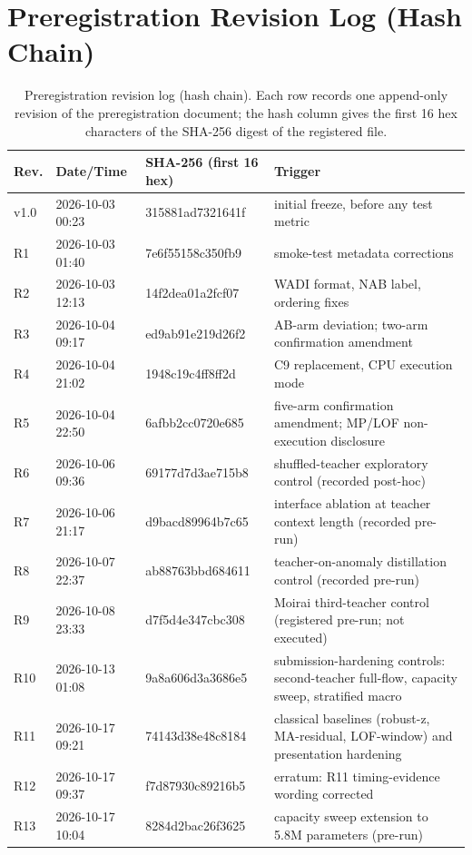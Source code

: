 \documentclass[pdflatex,sn-basic,Numbered]{sn-jnl}
\begin{document}
\appendix
\section{Preregistration Revision Log (Hash Chain)}\label{app:hashchain}
\begin{table}[t]
\centering
\scriptsize
\caption{Preregistration revision log (hash chain). Each row records one
append-only revision of the preregistration document; the hash column gives
the first 16 hex characters of the SHA-256 digest of the registered file.}
\label{tab:hashchain}
\begin{tabular}{lllp{4.2cm}}
\toprule
Rev. & Date/Time & SHA-256 (first 16 hex) & Trigger \\
\midrule
v1.0 & 2026-10-03 00:23 & 315881ad7321641f & initial freeze, before any test metric \\
R1 & 2026-10-03 01:40 & 7e6f55158c350fb9 & smoke-test metadata corrections \\
R2 & 2026-10-03 12:13 & 14f2dea01a2fcf07 & WADI format, NAB label, ordering fixes \\
R3 & 2026-10-04 09:17 & ed9ab91e219d26f2 & AB-arm deviation; two-arm confirmation amendment \\
R4 & 2026-10-04 21:02 & 1948c19c4ff8ff2d & C9 replacement, CPU execution mode \\
R5 & 2026-10-04 22:50 & 6afbb2cc0720e685 & five-arm confirmation amendment; MP/LOF non-execution disclosure \\
R6 & 2026-10-06 09:36 & 69177d7d3ae715b8 & shuffled-teacher exploratory control (recorded post-hoc) \\
R7 & 2026-10-06 21:17 & d9bacd89964b7c65 & interface ablation at teacher context length (recorded pre-run) \\
R8 & 2026-10-07 22:37 & ab88763bbd684611 & teacher-on-anomaly distillation control (recorded pre-run) \\
R9 & 2026-10-08 23:33 & d7f5d4e347cbc308 & Moirai third-teacher control (registered pre-run; not executed) \\
R10 & 2026-10-13 01:08 & 9a8a606d3a3686e5 & submission-hardening controls: second-teacher full-flow, capacity sweep, stratified macro \\
R11 & 2026-10-17 09:21 & 74143d38e48c8184 & classical baselines (robust-z, MA-residual, LOF-window) and presentation hardening \\
R12 & 2026-10-17 09:37 & f7d87930c89216b5 & erratum: R11 timing-evidence wording corrected \\
R13 & 2026-10-17 10:04 & 8284d2bac26f3625 & capacity sweep extension to 5.8M parameters (pre-run) \\

\end{tabular}
\end{table}
\end{document}
